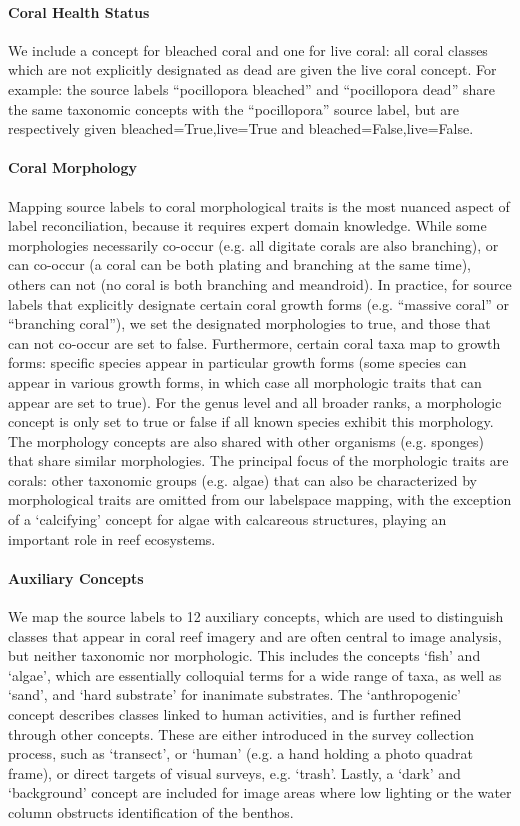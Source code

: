 \documentclass[10pt,twocolumn,letterpaper]{article}
\begin{document}
\paragraph{Coral Health Status} We include a concept for bleached coral and one for live coral: all coral classes which are not explicitly designated as dead are given the live coral concept. For example: the source labels ``pocillopora bleached'' and ``pocillopora dead'' share the same taxonomic concepts with the ``pocillopora'' source label, but are respectively given bleached=True,live=True and bleached=False,live=False. 

\paragraph{Coral Morphology} Mapping source labels to coral morphological traits is the most nuanced aspect of label reconciliation, because it requires expert domain knowledge. While some morphologies necessarily co-occur (e.g. all digitate corals are also branching), or can co-occur (a coral can be both plating and branching at the same time), others can not (no coral is both branching and meandroid). In practice, for source labels that explicitly designate certain coral growth forms (e.g. ``massive coral'' or ``branching coral''), we set the designated morphologies to true, and those that can not co-occur are set to false. Furthermore, certain coral taxa map to growth forms: specific species appear in particular growth forms (some species can appear in various growth forms, in which case all morphologic traits that can appear are set to true). For the genus level and all broader ranks, a morphologic concept is only set to true or false if all known species exhibit this morphology. The morphology concepts are also shared with other organisms (e.g. sponges) that share similar morphologies. The principal focus of the morphologic traits are corals: other taxonomic groups (e.g. algae) that can also be characterized by morphological traits are omitted from our labelspace mapping, with the exception of a `calcifying' concept for algae with calcareous structures, playing an important role in reef ecosystems.

\paragraph{Auxiliary Concepts}
We map the source labels to 12 auxiliary concepts, which are used to distinguish classes that appear in coral reef imagery and are often central to image analysis, but neither taxonomic nor morphologic. This includes the concepts `fish' and `algae', which are essentially colloquial terms for a wide range of taxa, as well as `sand', and `hard substrate' for inanimate substrates.
The `anthropogenic' concept describes classes linked to human activities, and is further refined through other concepts. These are either introduced in the survey collection process, such as `transect', or `human' (e.g. a hand holding a photo quadrat frame), or direct targets of visual surveys, e.g. `trash'. Lastly, a `dark' and `background' concept are included for image areas where low lighting or the water column obstructs identification of the benthos. 
\end{document}
